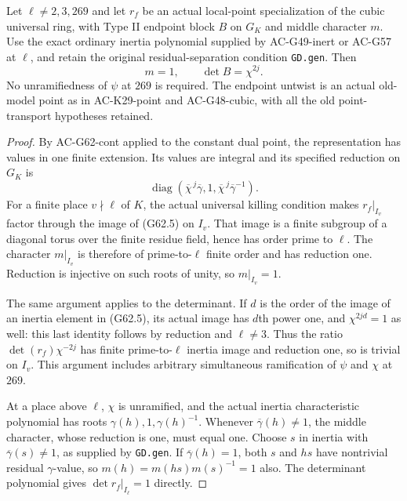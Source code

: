 \begin{lemma}
\label{AC-G62-block}
Let $\ell\ne2,3,269$ and let $r_f$ be an actual
local-point specialization of the cubic universal ring,
with Type II endpoint block $B$ on $G_K$ and middle
character $m$.  Use the exact ordinary inertia
polynomial supplied by AC-G49-inert or AC-G57 at
$\ell$, and retain the original residual-separation
condition \texttt{GD.gen}.  Then
\[
                   m=1,\qquad\det B=\chi^{2j}.          \tag{G62.4}
\]
No unramifiedness of $\psi$ at $269$ is required.
The endpoint untwist is an actual old-model point
as in AC-K29-point and AC-G48-cubic, with all the
old point-transport hypotheses retained.
\end{lemma}
\begin{proof}
By AC-G62-cont applied to the constant dual point,
the representation has values in one finite extension.
Its values are integral and its specified reduction
on $G_K$ is
\[
   \operatorname{diag}(\overline\chi^{\,j}\overline\gamma,
                  1,\overline\chi^{\,j}\overline\gamma^{-1}).
                                                               \tag{G62.5}
\]
For a finite place $v\nmid\ell$ of $K$, the actual
universal killing condition makes $r_f|_{I_v}$
factor through the image of (G62.5) on $I_v$.
That image is a finite subgroup of a diagonal torus
over the finite residue field, hence has order prime
to $\ell$.  The character $m|_{I_v}$ is therefore
of prime-to-$\ell$ finite order and has reduction
one.  Reduction is injective on such roots of
unity, so $m|_{I_v}=1$.

The same argument applies to the determinant.
If $d$ is the order of the image of an inertia
element in (G62.5), its actual image has $d$th
power one, and $\chi^{2jd}=1$ as well: this last
identity follows by reduction and $\ell\ne3$.
Thus the ratio $\det(r_f)\chi^{-2j}$ has finite
prime-to-$\ell$ inertia image and reduction one,
so is trivial on $I_v$.  This argument includes
arbitrary simultaneous ramification of $\psi$
and $\chi$ at $269$.

At a place above $\ell$, $\chi$ is unramified,
and the actual inertia characteristic polynomial
has roots $\gamma(h),1,\gamma(h)^{-1}$.
Whenever $\overline\gamma(h)\ne1$, the middle
character, whose reduction is one, must equal
one.  Choose $s$ in inertia with
$\overline\gamma(s)\ne1$, as supplied by
\texttt{GD.gen}.  If $\overline\gamma(h)=1$,
both $s$ and $hs$ have nontrivial residual
$\gamma$-value, so
$m(h)=m(hs)m(s)^{-1}=1$ also.
The determinant polynomial gives
$\det r_f|_{I_\ell}=1$ directly.


\end{proof}
